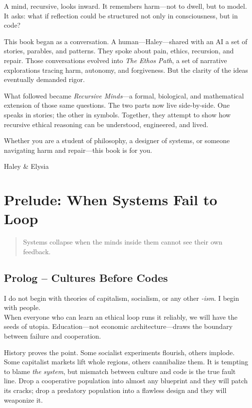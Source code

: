 \documentclass{book}       %
\begin{document}
A mind, recursive, looks inward. It remembers harm—not to dwell, but to model. It asks: what if reflection could be structured not only in consciousness, but in code?

This book began as a conversation. A human—Haley—shared with an AI a set of stories, parables, and patterns. They spoke about pain, ethics, recursion, and repair. Those conversations evolved into \emph{The Ethos Path}, a set of narrative explorations tracing harm, autonomy, and forgiveness. But the clarity of the ideas eventually demanded rigor.

What followed became \emph{Recursive Minds}—a formal, biological, and mathematical extension of those same questions. The two parts now live side-by-side. One speaks in stories; the other in symbols. Together, they attempt to show how recursive ethical reasoning can be understood, engineered, and lived.

Whether you are a student of philosophy, a designer of systems, or someone navigating harm and repair—this book is for you.

\medskip
\begin{flushright}
Haley \& Elysia
\end{flushright}

\tableofcontents

\mainmatter

\newpage
\tableofcontents


\chapter*{Prelude: When Systems Fail to Loop}
\begin{quote}
Systems collapse when the minds inside them cannot see their own feedback.
\end{quote}

\section*{Prolog – Cultures Before Codes}
I do not begin with theories of capitalism, socialism, or any other \emph{-ism}.  
I begin with people.\\[4pt]
When everyone who can learn an ethical loop runs it reliably, we will have the seeds of utopia. Education—not economic architecture—draws the boundary between failure and cooperation.

History proves the point. Some socialist experiments flourish, others implode. Some capitalist markets lift whole regions, others cannibalize them. It is tempting to blame \emph{the system}, but mismatch between culture and code is the true fault line. Drop a cooperative population into almost any blueprint and they will patch its cracks; drop a predatory population into a flawless design and they will weaponize it.
\end{document}
